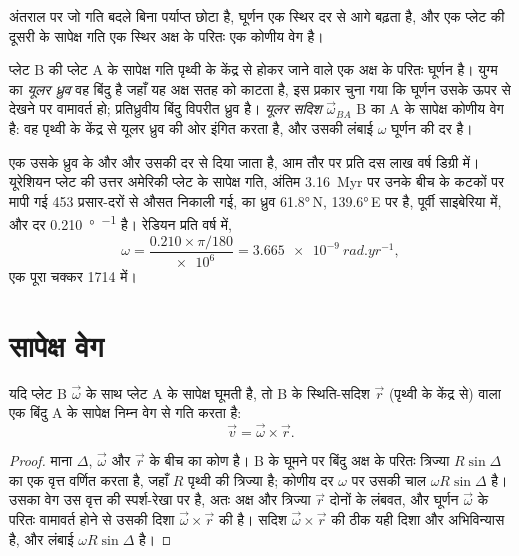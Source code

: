 अंतराल पर जो गति बदले बिना पर्याप्त छोटा है, घूर्णन एक स्थिर दर से आगे बढ़ता है, और एक प्लेट की दूसरी के सापेक्ष गति एक स्थिर अक्ष के परितः एक कोणीय वेग है।

\begin{definition}[यूलर ध्रुव; यूलर सदिश]\label{def:b1:plate-kinematics:euler-pole}
प्लेट B की प्लेट A के सापेक्ष गति पृथ्वी के केंद्र से होकर जाने वाले एक अक्ष के परितः घूर्णन है। युग्म का \emph{यूलर ध्रुव} वह बिंदु है जहाँ यह अक्ष सतह को काटता है, इस प्रकार चुना गया कि घूर्णन उसके ऊपर से देखने पर वामावर्त हो; प्रतिध्रुवीय बिंदु विपरीत ध्रुव है। \emph{यूलर सदिश} $\vec\omega_{BA}$ B का A के सापेक्ष कोणीय वेग है: वह पृथ्वी के केंद्र से यूलर ध्रुव की ओर इंगित करता है, और उसकी लंबाई $\omega$ घूर्णन की दर है।
\end{definition}

एक  उसके ध्रुव के  और  और उसकी दर से दिया जाता है, आम तौर पर प्रति दस लाख वर्ष डिग्री में। यूरेशियन प्लेट की उत्तर अमेरिकी प्लेट के सापेक्ष गति, अंतिम \qty{3.16}{Myr} पर उनके बीच के कटकों पर मापी गई 453 प्रसार-दरों से औसत निकाली गई, का ध्रुव \ang{61.8}\,N, \ang{139.6}\,E पर है, पूर्वी साइबेरिया में, और दर \qty{0.210}{\degree\per\Myr} है। रेडियन प्रति वर्ष में,
\[
  \omega = \frac{0.210\times\pi/180}{\num{e6}} = \qty{3.665e-9}{rad.yr^{-1}},
\]
एक पूरा चक्कर \qty{1714}{\Myr} में।

\section{सापेक्ष वेग}

\begin{theorem}[घूमती प्लेट पर वेग]\label{thm:b1:plate-kinematics:velocity}
यदि प्लेट B  $\vec\omega$ के साथ प्लेट A के सापेक्ष घूमती है, तो B के स्थिति-सदिश $\vec r$ (पृथ्वी के केंद्र से) वाला एक बिंदु A के सापेक्ष निम्न वेग से गति करता है:
\[
  \vec v = \vec\omega\times\vec r .
\]
\end{theorem}

\begin{proof}
माना $\Delta$, $\vec\omega$ और $\vec r$ के बीच का कोण है। B के घूमने पर बिंदु अक्ष के परितः त्रिज्या $R\sin\Delta$ का एक वृत्त वर्णित करता है, जहाँ $R$ पृथ्वी की त्रिज्या है; कोणीय दर $\omega$ पर उसकी चाल $\omega R\sin\Delta$ है। उसका वेग उस वृत्त की स्पर्श-रेखा पर है, अतः अक्ष और त्रिज्या $\vec r$ दोनों के लंबवत, और घूर्णन $\vec\omega$ के परितः वामावर्त होने से उसकी दिशा $\vec\omega\times\vec r$ की है। सदिश $\vec\omega\times\vec r$ की ठीक यही दिशा और अभिविन्यास है, और लंबाई $\omega R\sin\Delta$ है।
\end{proof}

